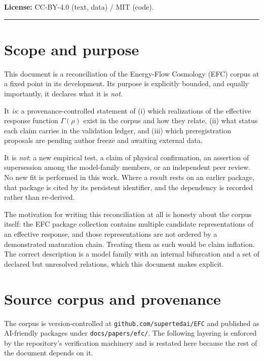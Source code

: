 \documentclass[11pt,a4paper]{article}
\begin{document}
\noindent\textbf{License:} CC-BY-4.0 (text, data) / MIT (code).

\vspace{1em}
\color{rulegray}\hrule\color{black}

\section{Scope and purpose}

This document is a reconciliation of the Energy-Flow Cosmology (EFC) corpus at a fixed point in its development. Its purpose is explicitly bounded, and equally importantly, it declares what it is \emph{not}.

It \emph{is}: a provenance-controlled statement of (i) which realizations of the effective response function $\Gamma(\rho)$ exist in the corpus and how they relate, (ii) what status each claim carries in the validation ledger, and (iii) which preregistration proposals are pending author freeze and awaiting external data.

It is \emph{not}: a new empirical test, a claim of physical confirmation, an assertion of supersession among the model-family members, or an independent peer review. No new fit is performed in this work. Where a result rests on an earlier package, that package is cited by its persistent identifier, and the dependency is recorded rather than re-derived.

The motivation for writing this reconciliation at all is honesty about the corpus itself: the EFC package collection contains multiple candidate representations of an effective response, and those representations are not ordered by a demonstrated maturation chain. Treating them as such would be claim inflation. The correct description is a model family with an internal bifurcation and a set of declared but unresolved relations, which this document makes explicit.

\section{Source corpus and provenance}

The corpus is version-controlled at \texttt{github.com/supertedai/EFC} and published as AI-friendly packages under \texttt{docs/papers/efc/}. The following layering is enforced by the repository's verification machinery and is restated here because the rest of the document depends on it.
\end{document}
